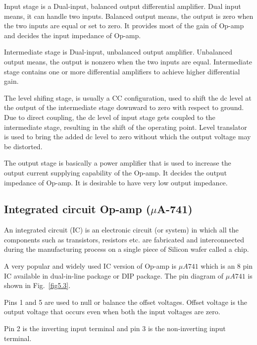 Input stage is a Dual-input, balanced output differential amplifier. Dual input means, it can handle two inputs. Balanced output means, the output is zero when the two inputs are equal or set to zero. It provides most of the gain of Op-amp and decides the input impedance of Op-amp.

Intermediate stage is Dual-input, unbalanced output amplifier. Unbalanced output means, the output is nonzero when the two inputs are equal. Intermediate stage contains one or more differential amplifiers to achieve higher differential gain.

The level shifing stage, is usually a CC configuration, used to shift the dc level at the output of the intermediate stage downward to zero with respect to ground. Due to direct coupling, the dc level of input stage gets coupled to the intermediate stage, resulting in the shift of the operating point. Level translator is used to bring the added dc level to zero without which the output voltage may be distorted.

The output stage is basically a power amplifier that is used to increase the output current supplying capability of the Op-amp. It decides the output impedance of Op-amp. It is desirable to have very low output impedance.\\[-23pt]

\subsection[Integrated circuit Op-amp ($\mu$A741)]{Integrated circuit Op-amp (\boldmath$\mu$A-741)}\label{sec5.1.5}

An integrated circuit (IC) is an electronic circuit (or system) in which all the components such as transistors, resistors etc. are fabricated and interconnected during the manufacturing process on a single piece of Silicon wafer called a chip.

A very popular and widely used IC version of Op-amp is $\mu A741$ which is an 8 pin IC available in dual-in-line package or DIP package. The pin diagram of $\mu A741$ is shown in Fig.~\ref{fig5.3}.

Pins 1 and 5 are used to null or balance the offset voltages. Offset voltage is the output voltage that occurs even when both the input voltages are zero.

Pin 2 is the inverting input terminal and pin 3 is the non-inverting input terminal.

